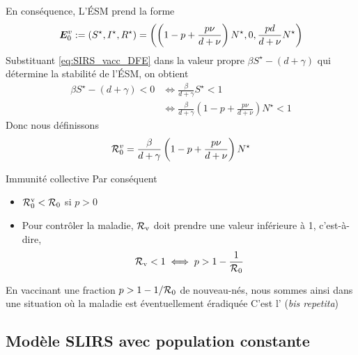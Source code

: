 \documentclass[aspectratio=169]{beamer}\usepackage[]{graphicx}\usepackage[]{xcolor}
\begin{document}
\begin{frame}
En conséquence, L'ÉSM prend la forme
\begin{equation}\label{eq:SIRS_vacc_DFE}
\bm{E}_0^v := (S^\star,I^\star,R^\star) =
\left(
\left(1-p+\frac{p\nu}{d+\nu}\right)N^\star,0,
\frac{pd}{d+\nu}N^\star
\right)
\end{equation}
\vfill
Substituant \eqref{eq:SIRS_vacc_DFE} dans la valeur propre $\beta S^\star-(d+\gamma)$ qui détermine la stabilité de l'ÉSM, on obtient
\begin{align*}
\beta S^\star-(d+\gamma)<0 &\iff
\frac\beta{d+\gamma} S^\star <1 \\
&\iff 
\frac\beta{d+\gamma}
\left(1-p+\frac{p\nu}{d+\nu}\right)N^\star<1
\end{align*}
Donc nous définissons
\begin{equation}\label{eq:SIRS_vacc_R0}
\mathcal{R}_0^v =
\frac\beta{d+\gamma}
\left(1-p+\frac{p\nu}{d+\nu}\right)N^\star
\end{equation}
\end{frame}


\begin{frame}{Immunité collective}
  Par conséquent
  \begin{itemize}
  \item $\mathcal{R}_0^{\textrm{v}}<\mathcal{R}_0$ si $p>0$
  \item Pour contrôler la maladie, $\mathcal{R}_{\text{v}}$ doit prendre une valeur inférieure à 1, c'est-à-dire,
  \begin{equation}
    \mathcal{R}_{\text{v}}<1 \iff p> 1-\frac{1}{\mathcal{R}_0}
  \end{equation}
  \end{itemize}
  \vfill
  En vaccinant une fraction $p>1-1/\mathcal{R}_0$ de nouveau-nés, nous sommes ainsi dans une situation où la maladie est éventuellement éradiquée
  \vfill
  C'est l' (\emph{bis repetita})
\end{frame}

\subsection{Modèle SLIRS avec population constante}
\end{document}
